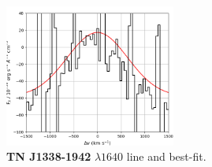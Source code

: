 \begin{appendix}
\begin{figure}
\centering
 \includegraphics[width=0.5\textwidth]{plots_chp4/TNJ1338_HeII.png}
 \caption[TN J1338-1942  line and best-fit]{{\bf TN J1338-1942}  $\lambda1640$ line and best-fit.}
\end{figure}

\end{appendix}
